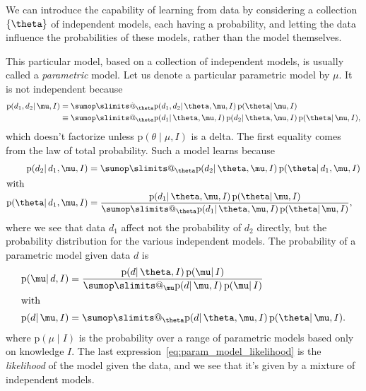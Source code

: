\documentclass[\ifafour a4paper,12pt,\else a5paper,10pt,\fi%
onecolumn,oneside,article,%
british%
]{memoir}
\makeatletter
\theoremstyle{remark}
\theoremstyle{innote}
\def\sum{\DOTSI\sumop\slimits@}
\DeclarePairedDelimiter\set{\{}{\}}
\newcommand*{\pf}{\mathrm{p}}%
\renewcommand*{\|}{\mathpunct{|}}
\newcommand*{\yth}{\theta}
\newcommand*{\ymu}{\mu}
\newcommand*{\yI}{I}
\makeatother
\begin{document}
\medskip

We can introduce the capability of learning from data by considering a
collection $\set{\yth}$ of independent models, each having a probability,
and letting the data influence the probabilities of these models, rather
than the model themselves.

This particular model, based on a collection of independent models, is
usually called a \emph{parametric} model. Let us denote a particular
parametric model by $\ymu$. It is not independent because
\begin{equation}
  \label{eq:param_model}
  \begin{aligned}
  \pf(d_1,d_2 \| \ymu, \yI) &=
\sum_{\yth}
\pf(d_1,d_2 \|\yth,\ymu,\yI) \, \pf(\yth \| \ymu,\yI)
\\&\equiv
\sum_{\yth}
\pf(d_1 \|\yth,\ymu,\yI) \, \pf(d_2 \|\yth,\ymu,\yI)
 \, \pf(\yth \| \ymu,\yI),
  \end{aligned}
\end{equation}
which doesn't factorize unless $\pf(\yth \| \ymu,\yI)$ is a delta. The
first equality comes from the law of total probability. Such a model learns
because
\begin{subequations}
    \label{eq:param_model_learn}
  \begin{align}
    \pf(d_2 \| d_1, \ymu, \yI) &=
    \sum_{\yth}
    \pf(d_2 \|\yth,\ymu,\yI) \, \pf(\yth \| d_1, \ymu,\yI)
    \\
    \shortintertext{with}
    \pf(\yth \| d_1, \ymu,\yI)
    &= \frac{
      \pf(d_1 \|\yth,\ymu,\yI) \, \pf(\yth \| \ymu,\yI)
      }{
      \sum_{\yth} \pf(d_1 \|\yth,\ymu,\yI) \, \pf(\yth \| \ymu,\yI)
      },
  \end{align}
\end{subequations}
where we see that data $d_1$ affect not the probability of $d_2$ directly,
but the probability distribution for the various independent models. The
probability of a parametric model given data $d$ is
\begin{subequations}
  \label{eq:prob_indep_model}
  \begin{align}
    \pf(\ymu \| d, \yI)
    &= \frac{
      \pf(d \|\yth,\yI) \, \pf(\ymu \| \yI)
      }{
      \sum_{\ymu}\pf(d \|\ymu,\yI) \, \pf(\ymu \| \yI)
      }
    \\
    \shortintertext{with}
    \label{eq:param_model_likelihood}
    \pf(d \|\ymu,\yI)
    & =  
      \sum_{\yth}
      \pf(d \|\yth,\ymu,\yI) \, \pf(\yth \| \ymu,\yI).
  \end{align}
\end{subequations}
where $\pf(\ymu \|\yI)$ is the probability over a range of parametric
models based only on knowledge $\yI$. The last
expression~\eqref{eq:param_model_likelihood} is the \emph{likelihood} of
the model given the data, and we see that it's given by a mixture of
independent models.
\end{document}
